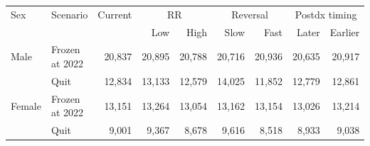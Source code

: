 \begingroup
\renewcommand{\arraystretch}{1.08}
\setlength{\tabcolsep}{4pt}
\begin{tabular}{llrrrrrrr}
\toprule
Sex & Scenario & Current & \multicolumn{2}{c}{RR} & \multicolumn{2}{c}{Reversal} & \multicolumn{2}{c}{Postdx timing} \\
 &  &  & Low & High & Slow & Fast & Later & Earlier \\
\midrule
Male & Frozen at 2022 & 20,837 & 20,895 & 20,788 & 20,716 & 20,936 & 20,635 & 20,917 \\
 & Quit & 12,834 & 13,133 & 12,579 & 14,025 & 11,852 & 12,779 & 12,861 \\
\midrule
Female & Frozen at 2022 & 13,151 & 13,264 & 13,054 & 13,162 & 13,154 & 13,026 & 13,214 \\
 & Quit & 9,001 & 9,367 & 8,678 & 9,616 & 8,518 & 8,933 & 9,038 \\
\bottomrule
\end{tabular}
\endgroup
